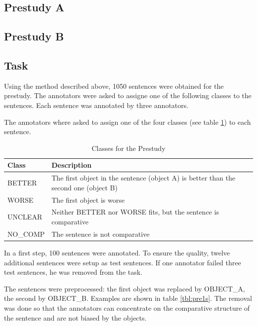 \subsection{Prestudy A}

\subsection{Prestudy B}

\subsection{Task}
Using the method described above, 1050 sentences were obtained for the prestudy. The annotators were asked to assigne one of the following classes to the sentences. Each sentence was annotated by three annotators.

The annotators where asked to assign one of the four classes (see table \ref{tbl:prestudyclasses}) to each sentence.

\begin{table}[h]
\centering
\caption{Classes for the Prestudy}
\label{tbl:prestudyclasses}
\begin{tabular}{@{}ll@{}}
\toprule
Class & Description \\ \midrule
BETTER & The first object in the sentence (object A) is better than the second one (object B)\\
WORSE & The first object is worse \\
UNCLEAR & Neither BETTER nor WORSE fits, but the sentence is comparative\\
NO\_COMP & The sentence is not comparative\\
\bottomrule
\end{tabular}
\end{table}



In a first step, 100 sentences were annotated. To ensure the quality, twelve additional sentences were setup as test sentences. If one annotator failed three test sentences, he was removed from the task.

The sentences were preprocessed: the first object was replaced by OBJECT\_A, the second by OBJECT\_B. Examples are shown in table \ref{tbl:pre1s}. The removal was done so that the annotators can concentrate on the comparative structure of the sentence and are not biased by the objects.


